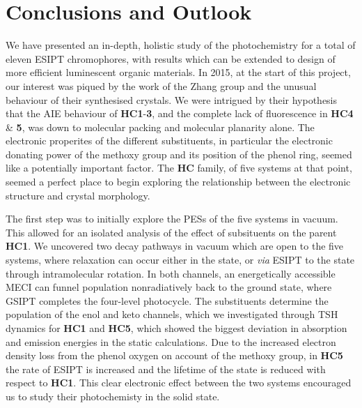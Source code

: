\chapter{Conclusions and Outlook}
\label{chapter: Conclusions}
We have presented an in-depth, holistic study of the photochemistry for a total of eleven ESIPT chromophores, with results which can be extended to design of more efficient luminescent organic materials. In 2015, at the start of this project, our interest was piqued by the work of the Zhang group and the unusual behaviour of their synthesised crystals.\cite{Cheng2015} We were intrigued by their hypothesis that the AIE behaviour of \textbf{HC1}-\textbf{3}, and the complete lack of fluorescence in \textbf{HC4} \& \textbf{5}, was down to molecular packing and molecular planarity alone. The electronic properites of the different substituents, in particular the electronic donating power of the methoxy group and its position of the phenol ring, seemed like a potentially important factor. The \textbf{HC} family, of five systems at that point, seemed a perfect place to begin exploring the relationship between the electronic structure and crystal morphology.

The first step was to initially explore the \acp{PES} of the five systems in vacuum. This allowed for an isolated analysis of the effect of subsituents on the parent \textbf{HC1}. We uncovered two decay pathways in vacuum which are open to the five systems, where relaxation can occur either in the \Estar{} state, or \textit{via} ESIPT to the \Kstar{} state through intramolecular rotation. In both channels, an energetically accessible \ac{MECI} can funnel population nonradiatively back to the ground state, where \ac{GSIPT} completes the four-level photocycle. The substituents determine the population of the enol and keto channels, which we investigated through \ac{TSH} dynamics for \textbf{HC1} and \textbf{HC5}, which showed the biggest deviation in absorption and emission energies in the static calculations. Due to the increased electron density loss from the phenol oxygen on account of the methoxy group, in \textbf{HC5} the rate of ESIPT is increased and the lifetime of the \Kstar{} state is reduced with respect to \textbf{HC1}. This clear electronic effect between the two systems encouraged us to study their photochemisty in the solid state.

